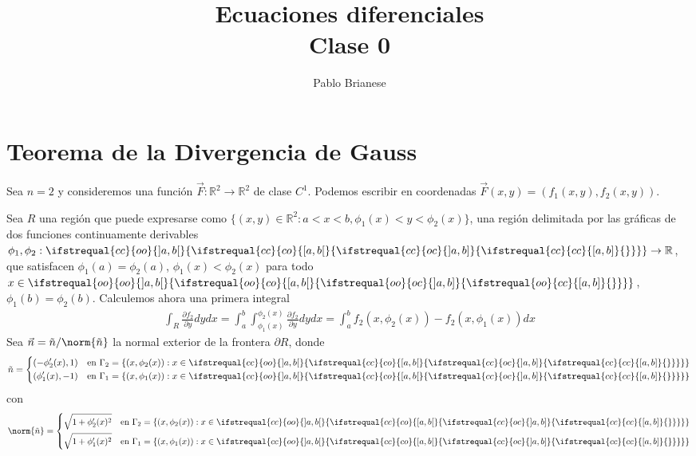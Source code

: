 \documentclass{report}
\title{Ecuaciones diferenciales \\ Clase 0}
\author{Pablo Brianese}
\newcommand{\realNumbers}{\mathbb{R}}
\theoremstyle{remark}
\newcommand{\leftOpenInterval}{\left]}
\newcommand{\rightOpenInterval}{\right[}
\newcommand{\leftClosedInterval}{\left[}
\newcommand{\rightClosedInterval}{\right]}
\newcommand{\interval}[3]{%
  \ifstrequal{#1}{oo}{%
    \leftOpenInterval #2, #3 \rightOpenInterval%
  }{%
    \ifstrequal{#1}{co}{%
      \leftClosedInterval #2, #3 \rightOpenInterval%
    }{%
      \ifstrequal{#1}{oc}{
        \leftOpenInterval #2, #3 \rightClosedInterval%
      }{%
        \ifstrequal{#1}{cc}{
          \leftClosedInterval #2, #3 \rightClosedInterval
        }{%
        }%
      }%
    }%
  }%
}
\begin{document}
  \maketitle

  \section{Teorema de la Divergencia de Gauss}

  Sea \(n = 2\) y consideremos una función \(\vec{F} : \realNumbers^2 \rightarrow \realNumbers^2\) de clase \(C^1\).
  Podemos escribir en coordenadas \(\vec{F}(x, y) = (f_1(x, y), f_2(x, y))\).
  
  Sea \(R\) una región que puede expresarse como \(\{(x, y) \in \realNumbers^2 :  a < x < b, \phi_1(x) < y < \phi_2(x)\}\), una región delimitada por las gráficas de dos funciones continuamente derivables \(\phi_1, \phi_2 : \interval{cc}{a}{b} \rightarrow \realNumbers\), que satisfacen \(\phi_1(a) = \phi_2(a)\), \(\phi_1(x) < \phi_2(x)\) para todo \(x \in \interval{oo}{a}{b}\), \(\phi_1(b) = \phi_2(b)\).
  Calculemos ahora una primera integral
  \begin{align}
    \int_R \frac{\partial f_2}{\partial y} dy dx
    =
    \int_a^b\int_{\phi_1(x)}^{\phi_2(x)} \frac{\partial f_2}{\partial y} dy dx
    =
    \int_a^b f_2(x, \phi_2(x)) - f_2(x, \phi_1(x)) dx
  \end{align}
  Sea \(\vec{n} = \tilde{n} / \norm{\tilde{n}}\) la normal exterior de la frontera \(\partial R\),
  donde
  \begin{align}
    \tilde{n}
    =
    \left\{
      \begin{aligned}
        (- \phi_2'(x), 1)
        && \text{en }
        \Gamma_2 = \{(x, \phi_2(x)) : x \in \interval{cc}{a}{b}\}
        \\
        (\phi_1'(x), - 1)
        && \text{en }
        \Gamma_1 = \{(x, \phi_1(x)) : x \in \interval{cc}{a}{b}\}
      \end{aligned}
    \right.
  \end{align}
  con
  \begin{align}
    \norm{\tilde{n}}
    =
    \left\{
      \begin{aligned}
        \sqrt{1 + \phi_2'(x)^2}
        && \text{en }
        \Gamma_2 = \{(x, \phi_2(x)) : x \in \interval{cc}{a}{b}\}
        \\
        \sqrt{1 + \phi_1'(x)^2}
        && \text{en }
        \Gamma_1 = \{(x, \phi_1(x)) : x \in \interval{cc}{a}{b}\}
      \end{aligned}
    \right.
  \end{align}
\end{document}
